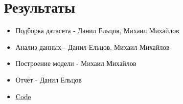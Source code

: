 \documentclass[a4paper]{article}
\begin{document}
\section{Результаты}
\begin{itemize}
    \item Подборка датасета - Данил Ельцов, Михаил Михайлов
    \item Анализ данных - Данил Ельцов, Михаил Михайлов
    \item Построение модели - Михаил Михайлов
    \item Отчёт - Данил Ельцов
    \item\href{https://github.com/Desiment/ml-study/blob/main/linear_regression}{Code}
\end{itemize}
\end{document}
